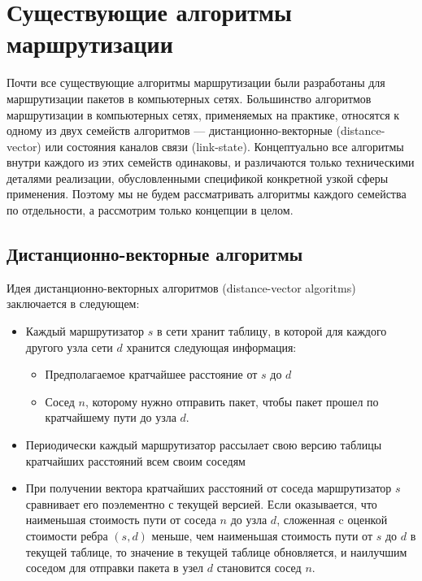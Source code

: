 \documentclass[specification, annotation]{itmo-student-thesis}
\begin{document}
\section{Существующие алгоритмы маршрутизации}

Почти все существующие алгоритмы маршрутизации были разработаны для
маршрутизации пакетов в компьютерных сетях. Большинство алгоритмов маршрутизации
в компьютерных сетях, применяемых на практике, относятся к одному из двух
семейств алгоритмов --- дистанционно-векторные (distance-vector)\cite{arpanet-orig} или
состояния каналов связи (link-state)\cite{link-state-arpanet}.
Концептуально все алгоритмы внутри каждого из этих семейств одинаковы, и различаются только
техническими деталями реализации, обусловленными спецификой конкретной узкой
сферы применения. Поэтому мы не будем рассматривать алгоритмы каждого семейства
по отдельности, а рассмотрим только концепции в целом.

\subsection{Дистанционно-векторные алгоритмы}

Идея дистанционно-векторных алгоритмов (distance-vector algoritms) заключается в
следующем:

\begin{itemize}
\item Каждый маршрутизатор $s$ в сети хранит таблицу, в которой для каждого другого узла
  сети $d$ хранится следующая информация:
  \begin{itemize}
  \item Предполагаемое кратчайшее расстояние от $s$ до $d$
  \item Сосед $n$, которому нужно отправить пакет, чтобы пакет прошел по
    кратчайшему пути до узла $d$.
  \end{itemize}
\item Периодически каждый маршрутизатор рассылает свою версию таблицы кратчайших
  расстояний всем своим соседям
\item При получении вектора кратчайших расстояний от соседа маршрутизатор $s$
  сравнивает его поэлементно с текущей версией. Если оказывается, что наименьшая
  стоимость пути от соседа $n$ до узла $d$, сложенная c оценкой стоимости ребра
  $(s, d)$ меньше, чем наименьшая стоимость пути от $s$ до $d$ в текущей
  таблице, то значение в текущей таблице обновляется, и наилучшим соседом для
  отправки пакета в узел $d$ становится сосед $n$.
\end{itemize}
\end{document}
